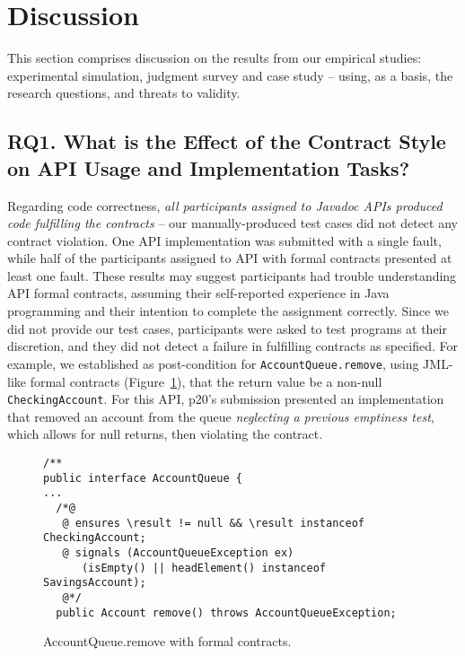 \section{Discussion}
\label{sec:discussion}

This section comprises discussion on the results from our empirical studies: experimental simulation, judgment survey and case study -- using, as a basis, the research questions, and threats to validity.


\subsection{RQ1. What is the Effect of the Contract Style on API Usage and Implementation Tasks?}
\label{rq1}

Regarding code correctness, \emph{all participants assigned to Javadoc APIs produced code
fulfilling the contracts} -- our manually-produced test cases did not detect any contract violation. One \contractjdoc{} API implementation was submitted with a single fault, while half of the participants assigned to API with formal contracts presented at least one fault.
These results may suggest participants had trouble understanding API formal contracts, assuming their self-reported experience in Java programming and their intention to complete the assignment correctly.
Since we did not provide our test cases, participants were asked to test programs at their discretion, and they did not detect a failure in fulfilling contracts as specified.
For example, we established as post-condition for \texttt{AccountQueue.remove}, using JML-like formal contracts (Figure~\ref{code:remove}), that the return value be a non-null \texttt{CheckingAccount}. For this API, p20's submission presented an implementation that removed an account from the queue \emph{neglecting a previous emptiness test}, which allows for null returns, then violating the contract.


\begin{figure}
\centering
\begin{lstlisting}[basicstyle=\footnotesize\ttfamily,name=figxpi, frame=lines, mathescape=true]
/**
public interface AccountQueue {
...
  /*@
   @ ensures \result != null && \result instanceof CheckingAccount;
   @ signals (AccountQueueException ex) 
      (isEmpty() || headElement() instanceof SavingsAccount);
   @*/
  public Account remove() throws AccountQueueException;

\end{lstlisting}
\caption{AccountQueue.remove with formal contracts.}
\label{code:remove}
\end{figure}

